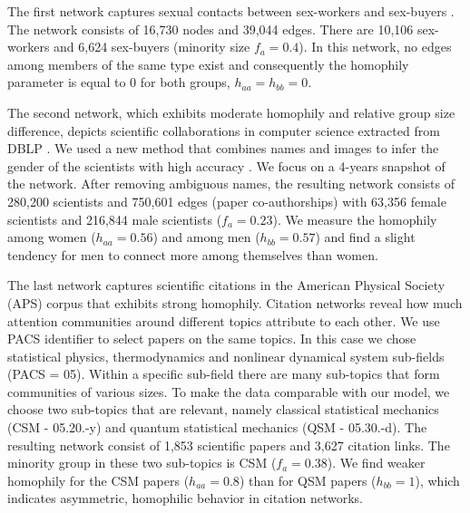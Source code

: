 The first network captures sexual contacts between sex-workers and sex-buyers  \cite{rocha2011simulated}. The network consists of 16,730 nodes and 39,044 edges. There are 10,106 sex-workers and  6,624 sex-buyers (minority size $f_a = 0.4$). In this network, no edges among members of the same type exist and consequently the homophily parameter is equal to 0 for both groups, $h_{aa} = h_{bb} = 0$. 



The second network, which exhibits moderate homophily and relative group size difference, depicts scientific collaborations in computer science extracted from DBLP \cite{DBLP}. We used a new method that combines names and images to infer the gender of the scientists with high accuracy \cite{karimi2016inferring}. We focus on a 4-years snapshot of the network. After removing ambiguous names, the resulting network consists of 280,200 scientists and 750,601 edges (paper co-authorships) with 63,356 female scientists and 216,844 male scientists ($f_a = 0.23$).
We measure the homophily among women ($h_{aa} = 0.56$) and among men ($h_{bb} = 0.57$) and find a slight tendency for men to connect more among themselves than women.


The last network captures scientific citations in the American Physical Society (APS) corpus that exhibits strong homophily. Citation networks reveal how much attention communities around different topics attribute to each other. We use PACS identifier to select papers on the same topics. In this case we chose statistical physics, thermodynamics and nonlinear dynamical system sub-fields (PACS = 05). Within a specific sub-field there are many sub-topics that form communities of various sizes. To make the data comparable with our model, we choose two sub-topics that are relevant, namely classical statistical mechanics (CSM - 05.20.-y) and quantum statistical mechanics (QSM - 05.30.-d). 
The resulting network consist of 1,853 scientific papers and 3,627 citation links. The minority group in these two sub-topics is CSM ($f_a = 0.38$).
We find weaker homophily for the CSM papers ($h_{aa} = 0.8$) than for QSM papers ($h_{bb} = 1$), which indicates asymmetric, homophilic behavior in citation networks. 


